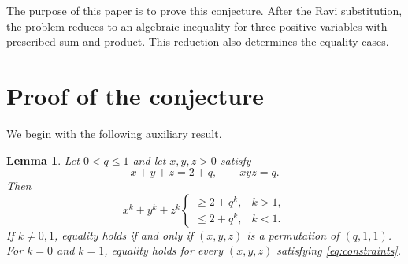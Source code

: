 \documentclass[11pt]{amsart}
\newtheorem{lemma}[theorem]{Lemma}
\theoremstyle{remark}
\begin{document}
The purpose of this paper is to prove this conjecture. After the Ravi
substitution, the problem reduces to an algebraic inequality for three
positive variables with prescribed sum and product. This reduction also
determines the equality cases.

\section{Proof of the conjecture}
We begin with the following auxiliary result.

\begin{lemma}\label{lem:power}
Let $0<q\le 1$ and let $x,y,z>0$ satisfy
\begin{equation}\label{eq:constraints}
 x+y+z=2+q,\qquad xyz=q.
\end{equation}
Then
\begin{equation}\label{eq:power}
 x^k+y^k+z^k
 \begin{cases}
 \ge 2+q^k, & k>1,\\[2mm]
 \le 2+q^k, & k<1.
 \end{cases}
\end{equation}
If $k\ne0,1$, equality holds if and only if $(x,y,z)$ is a permutation of
$(q,1,1)$. For $k=0$ and $k=1$, equality holds for every
$(x,y,z)$ satisfying \eqref{eq:constraints}.
\end{lemma}
\end{document}
